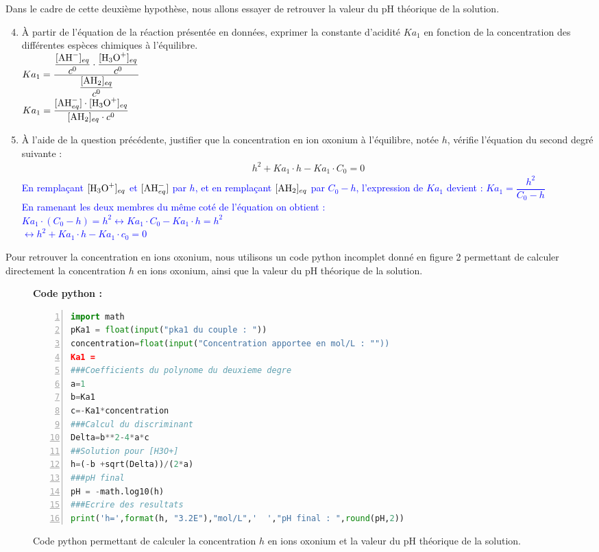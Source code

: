 \documentclass[a4paper,11pt]{article}
\begin{document}
Dans le cadre de cette deuxième hypothèse, nous allons essayer de retrouver la valeur du pH théorique de la solution.
\begin{enumerate}
\setcounter{enumi}{3}
    \item À partir de l'équation de la réaction présentée en données, exprimer la constante d'acidité $Ka_1$ en fonction de la concentration des différentes espèces chimiques à l'équilibre.\\
    \textcolor{blue}{$Ka_1 = \dfrac{\dfrac{[\ce{AH-}]_{eq}}{c^0} \cdot \dfrac{[\ce{H3O+}]_{eq}}{c^0}}{\dfrac{[\ce{AH2}]_{eq}}{c^0}}$\\
    $Ka_1 = \dfrac{[\ce{AH-}_{eq}] \cdot [\ce{H3O+}]_{eq}}{[\ce{AH2}]_{eq} \cdot c^0}$}
    \item À l'aide de la question précédente, justifier que la concentration en ion oxonium à l'équilibre, notée $h$, vérifie l'équation du second degré suivante :
    \begin{eqnarray}
    h^2 + Ka_1 \cdot h - Ka_1 \cdot C_0 =0\nonumber
    \end{eqnarray}
    \textcolor{blue}{En remplaçant $[\ce{H3O+}]_{eq}$ et $[\ce{AH-}_{eq}]$ par $h$, et en remplaçant $[\ce{AH2}]_{eq}$ par $C_0 - h$, l'expression de $Ka_1$ devient :
    $Ka_1 = \dfrac{h^2}{C_0 - h}$\\
    En ramenant les deux membres du même coté de l'équation on obtient :\\
    $Ka_1 \cdot (C_0 - h) = h^2 \leftrightarrow Ka_1 \cdot C_0 - Ka_1 \cdot h = h^2$\\
    $\leftrightarrow h^2 +Ka_1\cdot h - Ka_1\cdot c_0=0$}
\end{enumerate}
Pour retrouver la concentration en ions oxonium, nous utilisons un code python incomplet donné en figure 2 permettant de calculer directement la concentration $h$ en ions oxonium, ainsi que la valeur du pH théorique de la solution.
\begin{figure}
    \begin{minipage}{.1\linewidth} \hspace{.5cm} \end{minipage}
    \begin{minipage}{.8\linewidth}
    \textbf{Code python :}
    \begin{lstlisting}[showstringspaces=false,language = Python, numbers=left]
import math
pKa1 = float(input("pka1 du couple : "))
concentration=float(input("Concentration apportee en mol/L : ""))
Ka1 =
###Coefficients du polynome du deuxieme degre
a=1
b=Ka1
c=-Ka1*concentration
###Calcul du discriminant
Delta=b**2-4*a*c
##Solution pour [H3O+]
h=(-b +sqrt(Delta))/(2*a)
###pH final
pH = -math.log10(h)
###Ecrire des resultats
print('h=',format(h, "3.2E"),"mol/L",'  ',"pH final : ",round(pH,2))
\end{lstlisting}
\end{minipage}


    \caption{Code python permettant de calculer la concentration $h$ en ions oxonium et la valeur du pH théorique de la solution.}
    \label{fig:my_label}
\end{figure}
\end{document}

